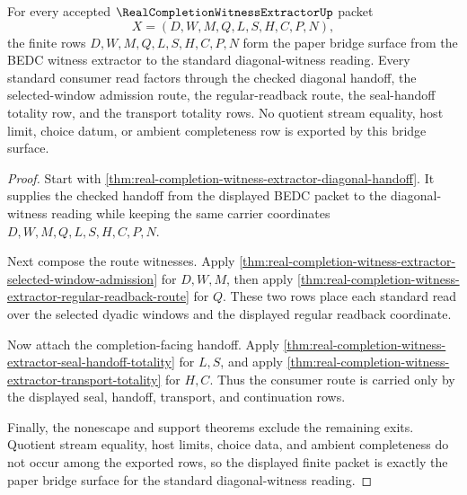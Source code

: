 \begin{theorem}
\label{thm:real-completion-witness-extractor-standard-bridge-surface}
For every accepted $\RealCompletionWitnessExtractorUp$ packet
$$
X=(D,W,M,Q,L,S,H,C,P,N),
$$
the finite rows $D,W,M,Q,L,S,H,C,P,N$ form the paper bridge surface from the BEDC witness extractor to the standard diagonal-witness reading. Every standard consumer read factors through the checked diagonal handoff, the selected-window admission route, the regular-readback route, the seal-handoff totality row, and the transport totality rows. No quotient stream equality, host limit, choice datum, or ambient completeness row is exported by this bridge surface.
\end{theorem}
\begin{proof}
Start with \autoref{thm:real-completion-witness-extractor-diagonal-handoff}. It supplies the checked handoff from the displayed BEDC packet to the diagonal-witness reading while keeping the same carrier coordinates $D,W,M,Q,L,S,H,C,P,N$.

Next compose the route witnesses. Apply \autoref{thm:real-completion-witness-extractor-selected-window-admission} for $D,W,M$, then apply \autoref{thm:real-completion-witness-extractor-regular-readback-route} for $Q$. These two rows place each standard read over the selected dyadic windows and the displayed regular readback coordinate.

Now attach the completion-facing handoff. Apply \autoref{thm:real-completion-witness-extractor-seal-handoff-totality} for $L,S$, and apply \autoref{thm:real-completion-witness-extractor-transport-totality} for $H,C$. Thus the consumer route is carried only by the displayed seal, handoff, transport, and continuation rows.

Finally, the nonescape and support theorems exclude the remaining exits. Quotient stream equality, host limits, choice data, and ambient completeness do not occur among the exported rows, so the displayed finite packet is exactly the paper bridge surface for the standard diagonal-witness reading.
\end{proof}

